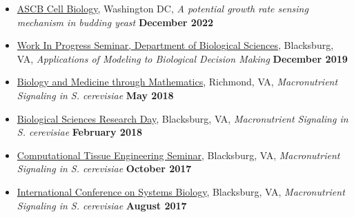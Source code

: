 \documentclass[10pt,a4paper,ragged2e]{altacv}
\begin{document}






\begin{itemize}
\item \ul{ASCB Cell Biology}, Washington DC, \textit{A potential growth rate sensing mechanism in budding yeast} \textbf{December 2022}
\item \ul{Work In Progress Seminar, Department of Biological Sciences}, Blacksburg, VA, \textit{Applications of Modeling to Biological Decision Making} \textbf{December 2019}
  \item \ul{Biology and  Medicine through Mathematics}, Richmond, VA, \textit{Macronutrient Signaling in S. cerevisiae} \textbf{May 2018}  
  \item \ul{Biological Sciences Research Day}, Blacksburg, VA, \textit{Macronutrient Signaling in S. cerevisiae} \textbf{February 2018}
  \item \ul{Computational Tissue Engineering Seminar}, Blacksburg, VA, \textit{Macronutrient Signaling in S. cerevisiae} \textbf{October 2017}
  \item \ul{International Conference on Systems Biology}, Blacksburg, VA, \textit{Macronutrient Signaling in S. cerevisiae} \textbf{August 2017}
\end{itemize}


\end{document}
